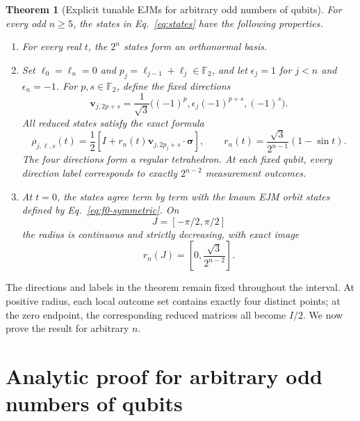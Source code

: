 \documentclass[11pt,a4paper]{article}
\numberwithin{equation}{section}
\newtheorem{theorem}{Theorem}[section]
\theoremstyle{definition}
\newcommand{\F}{\mathbb F}
\begin{document}
\begin{theorem}[Explicit tunable EJMs for arbitrary odd numbers of qubits]
\label{thm:main}
For every odd $n\geq5$, the states in Eq.~\eqref{eq:states} have the following properties.
\begin{enumerate}[label=\textup{(\roman*)},leftmargin=2.8em,itemsep=0.2em,topsep=0.3em]
\item For every real $t$, the $2^n$ states form an orthonormal basis.
\item Set $\ell_0=\ell_n=0$ and $p_j=\ell_{j-1}+\ell_j\in\F_2$, and let $\epsilon_j=1$ for $j<n$ and $\epsilon_n=-1$. For $p,s\in\F_2$, define the fixed directions
\begin{equation}
 \bm v_{j,2p+s}=\frac1{\sqrt3}
 \bigl((-1)^p,\epsilon_j(-1)^{p+s},(-1)^s\bigr).
 \label{eq:vertices}
\end{equation}
All reduced states satisfy the exact formula
\begin{equation}
 \boxed{\rho_{j,\ell,s}(t)=\frac12
 \left[I+r_n(t)\bm v_{j,2p_j+s}\cdot\bm\sigma\right],\qquad
 r_n(t)=\frac{\sqrt3}{2^{n-1}}(1-\sin t).}
 \label{eq:main-radius}
\end{equation}
The four directions form a regular tetrahedron. At each fixed qubit, every direction label corresponds to exactly $2^{n-2}$ measurement outcomes.
\item At $t=0$, the states agree term by term with the known EJM orbit states defined by Eq.~\eqref{eq:f0-symmetric}. On
\begin{equation}
 J=[-\pi/2,\pi/2]
 \label{eq:J}
\end{equation}
the radius is continuous and strictly decreasing, with exact image
\begin{equation}
 r_n(J)=\left[0,\frac{\sqrt3}{2^{n-2}}\right].
 \label{eq:range}
\end{equation}
\end{enumerate}
\end{theorem}

The directions and labels in the theorem remain fixed throughout the interval. At positive radius, each local outcome set contains exactly four distinct points; at the zero endpoint, the corresponding reduced matrices all become $I/2$. We now prove the result for arbitrary $n$.

\section{Analytic proof for arbitrary odd numbers of qubits}
\label{sec:proof}
\end{document}
